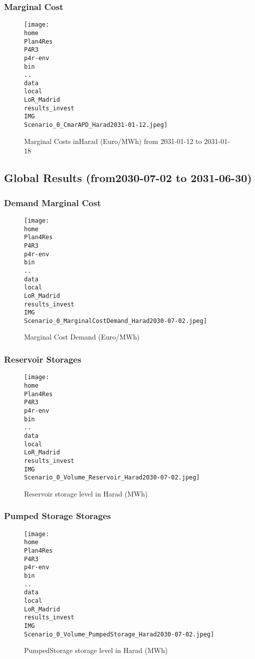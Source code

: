 \documentclass[10pt]{report}
\begin{document}
\subsubsection{Marginal Cost}
\begin{figure}[H]
\centering
\texttt{[image: \\home\\Plan4Res\\P4R3\\p4r-env\\bin\\..\\data\\local\\LoR\_Madrid\\results\_invest\\IMG\\Scenario\_0\_CmarAPD\_Harad2031-01-12.jpeg]}
\caption{Marginal Costs inHarad (Euro/MWh) from 2031-01-12 to 2031-01-18}
\label{fig:Scenario_0_CmarAPD_Harad2031-01-12.jpeg}
\end{figure}
\subsection{Global Results (from2030-07-02 to 2031-06-30)}
\subsubsection{Demand Marginal Cost}
\begin{figure}[H]
\centering
\texttt{[image: \\home\\Plan4Res\\P4R3\\p4r-env\\bin\\..\\data\\local\\LoR\_Madrid\\results\_invest\\IMG\\Scenario\_0\_MarginalCostDemand\_Harad2030-07-02.jpeg]}
\caption{Marginal Cost Demand (Euro/MWh)}
\label{fig:Scenario_0_MarginalCostDemand_Harad2030-07-02.jpeg}
\end{figure}
\subsubsection{Reservoir Storages}
\begin{figure}[H]
\centering
\texttt{[image: \\home\\Plan4Res\\P4R3\\p4r-env\\bin\\..\\data\\local\\LoR\_Madrid\\results\_invest\\IMG\\Scenario\_0\_Volume\_Reservoir\_Harad2030-07-02.jpeg]}
\caption{Reservoir storage level in Harad (MWh)}
\label{fig:Scenario_0_Volume_Reservoir_Harad2030-07-02.jpeg}
\end{figure}
\subsubsection{Pumped Storage Storages}
\begin{figure}[H]
\centering
\texttt{[image: \\home\\Plan4Res\\P4R3\\p4r-env\\bin\\..\\data\\local\\LoR\_Madrid\\results\_invest\\IMG\\Scenario\_0\_Volume\_PumpedStorage\_Harad2030-07-02.jpeg]}
\caption{PumpedStorage storage level in Harad (MWh)}
\label{fig:Scenario_0_Volume_PumpedStorage_Harad2030-07-02.jpeg}
\end{figure}
\end{document}
